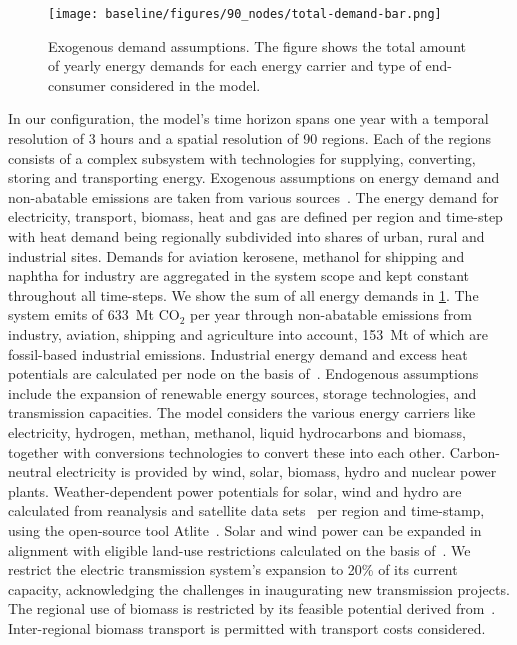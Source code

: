 \documentclass[twocolumn]{article}
\newcommand{\carbon}{CO$_2$}
\begin{document}
\begin{figure}
    \texttt{[image: baseline/figures/90\_nodes/total-demand-bar.png]}
    \caption{Exogenous demand assumptions. The figure shows the total amount of yearly energy demands for each energy carrier and type of end-consumer considered in the model.}
    \label{fig:total-demand-bar}
\end{figure}
%
In our configuration, the model's time horizon spans one year with a temporal resolution of 3 hours and a spatial resolution of 90 regions. Each of the regions consists of a complex subsystem with technologies for supplying, converting, storing and transporting energy. Exogenous assumptions on energy demand and non-abatable emissions are taken from various sources~\cite{piamanzGeoreferencedIndustrialSites2018,muehlenpfordtTimeSeries2019,mantzosJRCIDEES20152018,NationalEmissionsReported2023,EurostatCompleteEnergyBalance,uwekrienDemandlib2023}. The energy demand for electricity, transport, biomass, heat and gas are defined per region and time-step with heat demand being regionally subdivided into shares of urban, rural and industrial sites. Demands for aviation kerosene, methanol for shipping and naphtha for industry are aggregated in the system scope and kept constant throughout all time-steps. We show the sum of all energy demands in \ref{fig:total-demand-bar}. The system emits of 633~Mt \carbon{} per year through non-abatable emissions from industry, aviation, shipping and agriculture into account, 153~Mt of which are fossil-based industrial emissions. Industrial energy demand and excess heat potentials are calculated per node on the basis of~\cite{hotmaps_industrial_db}.
%
Endogenous assumptions include the expansion of renewable energy sources, storage technologies, and transmission capacities.
The model considers the various energy carriers like electricity, hydrogen, methan, methanol, liquid hydrocarbons and biomass, together with conversions technologies to convert these into each other.
Carbon-neutral electricity is provided by wind, solar, biomass, hydro and nuclear power plants. Weather-dependent power potentials for solar, wind and hydro are calculated from reanalysis and satellite data sets~\cite{hersbachERA5GlobalReanalysis2020,pfeifrothSurfaceRadiationData2017}  per region and time-stamp, using the open-source tool Atlite~\cite{hofmannAtliteLightweightPython2021}.
Solar and wind power can be expanded in alignment with eligible land-use restrictions calculated on the basis of~\cite{eeaCorineLandCover2012,eeaNatura2000Data2016}. We restrict the electric transmission system's expansion to 20\% of its current capacity, acknowledging the challenges in inaugurating new transmission projects.
The regional use of biomass is restricted by its feasible potential derived from~\cite{enspreso_database,instituteforenergyandtransportjointresearchcentreJRCEUTIMESModelBioenergy2015}. Inter-regional biomass transport is permitted with transport costs considered.
\end{document}
